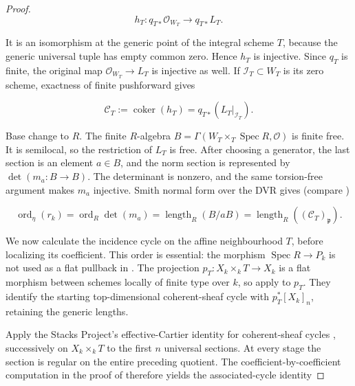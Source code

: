 \begin{proof}
\[
 h_T:q_{T*}\mathcal O_{W_T}\longrightarrow q_{T*}L_T.
\]

It is an isomorphism at the generic point of the integral scheme \(T\),
because the generic universal tuple has empty common zero.  Hence
\(h_T\) is injective.  Since \(q_T\) is finite, the original map
\(\mathcal O_{W_T}\to L_T\) is injective as well.  If
\(\mathcal I_T\subset W_T\) is its zero scheme, exactness of finite
pushforward gives

\begin{equation}
 \mathcal C_T:=\operatorname{coker}(h_T)
 =q_{T*}(L_T|_{\mathcal I_T}).
 \label{eq:p171-revised2-cokernel-sheaf}
\end{equation}

Base change to \(R\).  The finite \(R\)-algebra
\(B=\Gamma(W_T\times_T\operatorname{Spec}R,\mathcal O)\) is finite free.
It is semilocal, so the restriction of \(L_T\) is free.  After choosing a
generator, the last section is an element \(a\in B\), and the norm section
is represented by \(\det(m_a:B\to B)\).  The determinant is nonzero, and
the same torsion-free argument makes \(m_a\) injective.  Smith normal form
over the DVR gives (compare
\cite[\emph{Lengths and determinants}, Tag~02QA]{stacks-project})

\begin{equation}
 \operatorname{ord}_\eta(r_k)
 =\operatorname{ord}_R\det(m_a)
 =\operatorname{length}_R(B/aB)
 =\operatorname{length}_R((\mathcal C_T)_\mathfrak p).
 \label{eq:p171-revised2-dvr-length}
\end{equation}

We now calculate the incidence cycle on the affine neighbourhood \(T\),
before localizing its coefficient.  This order is essential: the morphism
\(\operatorname{Spec}R\to P_k\) is not used as a flat pullback in
\cite[Tag~02RA]{stacks-project}.  The projection
\(p_T:X_k\times_kT\to X_k\) is a flat morphism between schemes locally of
finite type over \(k\), so
\cite[Definition~42.14.1 and Lemma~42.14.4, Tag~02RA]{stacks-project}
apply to \(p_T\).  They identify the starting
top-dimensional coherent-sheaf cycle with
\(p_T^*[X_k]_n\), retaining the generic lengths.

Apply the Stacks Project's effective-Cartier identity for coherent-sheaf
cycles \cite[Lemma~42.29.5, Tag~02TB]{stacks-project}, successively on
\(X_k\times_kT\) to the first \(n\) universal sections.  At every stage
the section is regular on the entire preceding quotient.  The
coefficient-by-coefficient computation in the proof of
\cite[Tag~02TB]{stacks-project} therefore yields the associated-cycle
identity


\end{proof}

